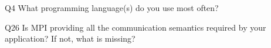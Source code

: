 \begin{description}%
\item{Q4} What programming language(s) do you use most often?%
\item{Q26} Is MPI providing all the communication semantics required by your application? If not, what is missing?%
\end{description}%
